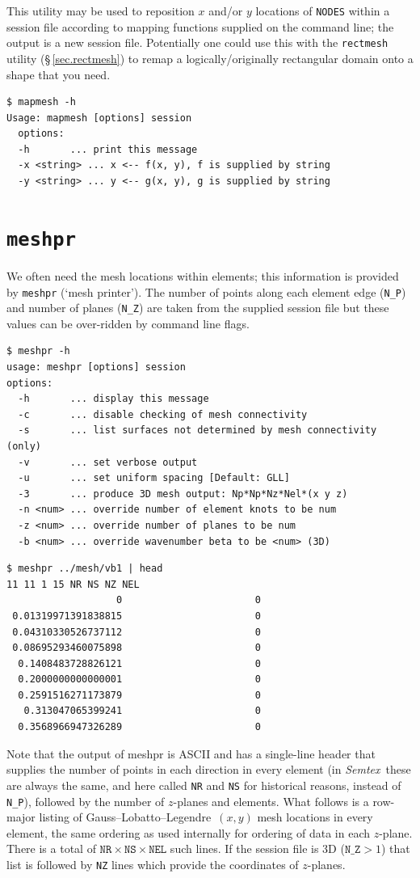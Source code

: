\documentclass[11pt]{report}
\newcommand{\Semtex}{\emph{Semtex}} \newcommand{\Dog}{\emph{Dog}}
\newcommand\GLL{Gauss--Lobatto--Legendre}
\begin{document}
This utility may be used to reposition $x$ and/or $y$ locations of
\verb|NODES| within a session file according to mapping functions
supplied on the command line; the output is a new session file.
Potentially one could use this with the \verb|rectmesh| utility
(\S\,\ref{sec.rectmesh}) to remap a logically/originally rectangular
domain onto a shape that you need.
%
{\small
\begin{verbatim}
$ mapmesh -h
Usage: mapmesh [options] session
  options:
  -h       ... print this message
  -x <string> ... x <-- f(x, y), f is supplied by string
  -y <string> ... y <-- g(x, y), g is supplied by string
\end{verbatim}
}
%

\section{\texttt{meshpr}}
\label{sec.meshpr}

We often need the mesh locations within elements; this information is
provided by \verb|meshpr| (`mesh printer').  The number of points
along each element edge (\verb|N_P|) and number of planes (\verb|N_Z|)
are taken from the supplied session file but these values can be
over-ridden by command line flags.
%
{\small
\begin{verbatim}
$ meshpr -h
usage: meshpr [options] session
options:
  -h       ... display this message
  -c       ... disable checking of mesh connectivity
  -s       ... list surfaces not determined by mesh connectivity (only)
  -v       ... set verbose output
  -u       ... set uniform spacing [Default: GLL]
  -3       ... produce 3D mesh output: Np*Np*Nz*Nel*(x y z)
  -n <num> ... override number of element knots to be num
  -z <num> ... override number of planes to be num
  -b <num> ... override wavenumber beta to be <num> (3D)
\end{verbatim}
}
%
{\small
\begin{verbatim}
$ meshpr ../mesh/vb1 | head
11 11 1 15 NR NS NZ NEL
                   0                       0
 0.01319971391838815                       0
 0.04310330526737112                       0
 0.08695293460075898                       0
  0.1408483728826121                       0
  0.2000000000000001                       0
  0.2591516271173879                       0
   0.313047065399241                       0
  0.3568966947326289                       0
\end{verbatim}
}
%
Note that the output of meshpr is ASCII and has a single-line header
that supplies the number of points in each direction in every element
(in \Semtex\ these are always the same, and here called \verb|NR| and
\verb|NS| for historical reasons, instead of \verb|N_P|), followed by
the number of $z$-planes and elements.  What follows is a row-major
listing of \GLL\ $(x,y)$ mesh locations in every element, \ie the same
ordering as used internally for ordering of data in each $z$-plane.
There is a total of $\texttt{NR}\times\texttt{NS}\times\texttt{NEL}$
such lines.  If the session file is 3D (\ie $\texttt{N\_Z}>1$) that list
is followed by \texttt{NZ} lines which provide the coordinates of
$z$-planes.
\end{document}
